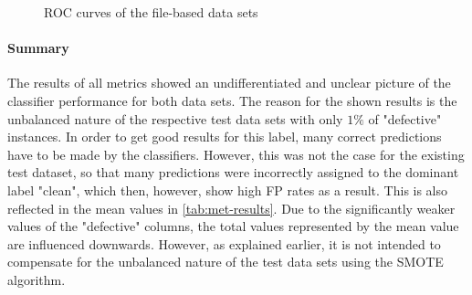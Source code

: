 \begin{figure}[t]
  \caption{ROC curves of the file-based data sets \label{roc-file}}
\end{figure}

\paragraph{Summary}

The results of all metrics showed an undifferentiated and unclear picture of the classifier performance for both data sets. The reason for the shown results is the unbalanced nature of the respective test data sets with only $1\%$ of "defective" instances. In order to get good results for this label, many correct predictions have to be made by the classifiers. However, this was not the case for the existing test dataset, so that many predictions were incorrectly assigned to the dominant label "clean", which then, however, show high FP rates as a result. This is also reflected in the mean values in \autoref{tab:met-results}. Due to the significantly weaker values of the "defective" columns, the total values represented by the mean value are influenced downwards. However, as explained earlier, it is not intended to compensate for the unbalanced nature of the test data sets using the SMOTE algorithm.